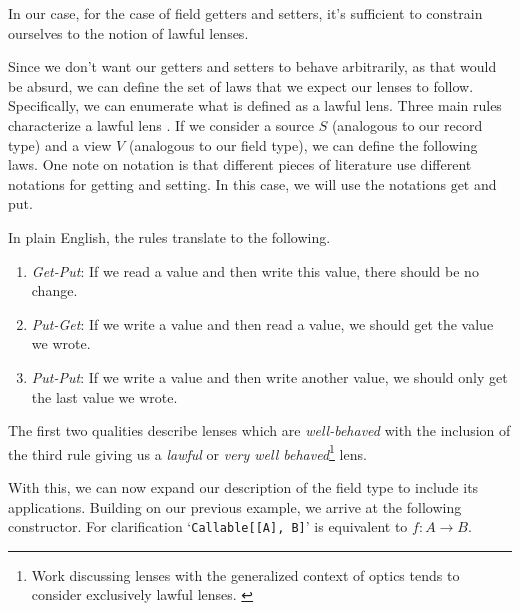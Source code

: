 In our case, for the case of field getters and setters, it's sufficient to constrain ourselves to the notion of lawful lenses.

\begin{definition}
 Since we don't want our getters and setters to behave arbitrarily, as that would be absurd, we can define the set of laws that we expect our lenses to follow. Specifically, we can enumerate what is defined as a lawful lens. Three main rules characterize a lawful lens \cite{Foster2005Combinators}. If we consider a source $S$ (analogous to our record type) and a view $V$ (analogous to our field type), we can define the following laws. One note on notation is that different pieces of literature use different notations for getting and setting. In this case, we will use the notations $\text{get}$ and $\text{put}$.
  
  
  
 In plain English, the rules translate to the following.
  
  \begin{enumerate}
    \item \textit{Get-Put}: If we read a value and then write this value, there should be no change.
    \item \textit{Put-Get}: If we write a value and then read a value, we should get the value we wrote.
    \item \textit{Put-Put}: If we write a value and then write another value, we should only get the last value we wrote.
  \end{enumerate}
  
 The first two qualities describe lenses which are \textit{well-behaved} with the inclusion of the third rule giving us a \textit{lawful} or \textit{very well behaved}\footnote{Work discussing lenses with the generalized context of optics tends to consider exclusively lawful lenses. \cite{Clarke2024Profunctor, Riley2018Categories}} lens.
\end{definition}

With this, we can now expand our description of the field type to include its applications. Building on our previous example, we arrive at the following constructor. For clarification `\texttt{Callable[[A], B]}' is equivalent to $f : A \rightarrow B$.

\begin{listing}[ht!]
  
  \caption{Expanded field type constructor pseudocode}
  \label{listing:type_constructor_pseudo2}
\end{listing}

